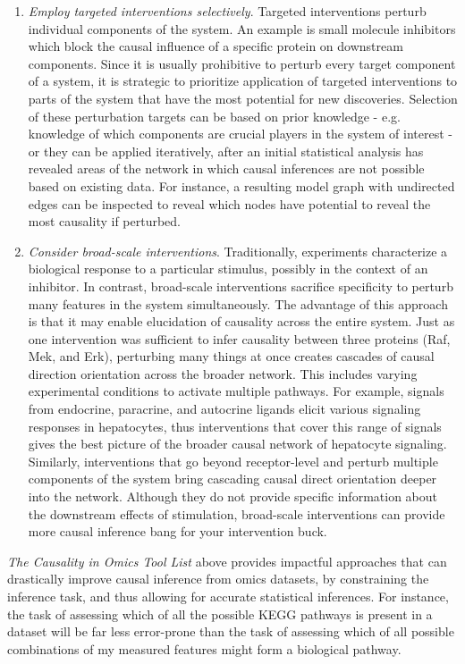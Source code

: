 \documentclass[journal=jacsat,manuscript=article]{achemso}
\begin{document}
\begin{enumerate}
\item \textit{Employ targeted interventions selectively}. Targeted interventions perturb individual components of the system.  An example is small molecule inhibitors which block the causal influence of a specific protein on downstream components.  Since it is usually prohibitive to perturb every target component of a system, it is strategic to prioritize application of targeted interventions to parts of the system that have the most potential for new discoveries.  Selection of these perturbation targets can be based on prior knowledge - e.g. knowledge of which components are crucial players in the system of interest - or they can be applied iteratively, after an initial statistical analysis has revealed areas of the network in which causal inferences are not possible based on existing data.  For instance, a resulting model graph with undirected edges can be inspected to reveal which nodes have potential to reveal the most causality if perturbed.
\item \textit{Consider broad-scale interventions}. Traditionally, experiments characterize a biological response to a particular stimulus, possibly in the context of an inhibitor.  In contrast, broad-scale interventions sacrifice specificity to perturb many features in the system simultaneously.  The advantage of this approach is that it may enable elucidation of  causality across the entire system.  Just as one intervention was sufficient to infer causality between three proteins (Raf, Mek, and Erk), perturbing many things at once creates cascades of causal direction orientation across the broader network.  This includes varying experimental conditions to activate multiple pathways.  For example, signals from endocrine, paracrine, and autocrine ligands elicit various signaling responses in hepatocytes, thus interventions that cover this range of signals gives the best picture of the broader causal network of hepatocyte signaling.  Similarly, interventions that go beyond receptor-level and perturb multiple components of the system bring cascading causal direct orientation deeper into the network.  Although they do not provide specific information about the downstream effects of stimulation,  broad-scale interventions can provide more causal inference bang for your intervention buck.   

\end{enumerate}

\textit{The Causality in Omics Tool List} above provides impactful approaches
that can drastically improve causal inference from omics datasets, by
constraining the inference task, and thus allowing for accurate
statistical inferences. For instance, the task of assessing which of all
the possible KEGG pathways is present in a dataset will be far less
error-prone than the task of assessing which of all possible
combinations of my measured features might form a biological pathway.
\end{document}
